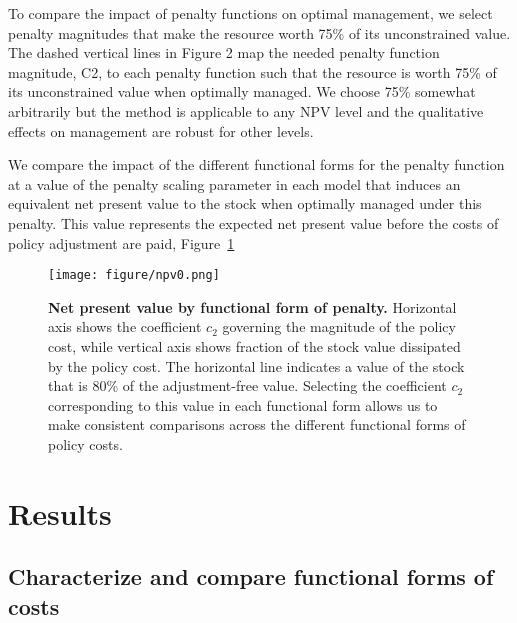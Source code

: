 \documentclass[authoryear, review, 12pt]{elsarticle}
\begin{document}
To compare the impact of penalty functions on optimal management, we select penalty magnitudes that make the resource worth 75\% of its unconstrained value.   The dashed vertical lines in Figure 2 map the needed penalty function magnitude, C2, to each penalty function such that the resource is worth 75\% of its unconstrained value when optimally managed.  We choose 75\% somewhat arbitrarily but the method is applicable to any NPV level and the qualitative effects on management are robust for other levels.  




We compare the impact of the different functional forms for the penalty
function at a value of the penalty scaling parameter in each model that
induces an equivalent net present value to the stock when optimally
managed under this penalty. This value represents the expected net
present value before the costs of policy adjustment are paid, Figure~\ref{fig:apples}

  \begin{figure}
    \begin{center}
\texttt{[image: figure/npv0.png]}
\caption{\textbf{Net present value by functional form of penalty.} Horizontal axis shows the coefficient $c_2$ governing the magnitude of the policy cost, while vertical axis shows fraction of the stock value dissipated by the policy cost.  The horizontal line indicates a value of the stock that is 80\% of the adjustment-free value. Selecting the coefficient $c_2$ corresponding to this value in each functional form allows us to make consistent comparisons across the different functional forms of policy costs.  }
\label{fig:apples}
\end{center}
\end{figure}


\section{Results}
\subsection{Characterize and compare functional forms of costs}
\end{document}
